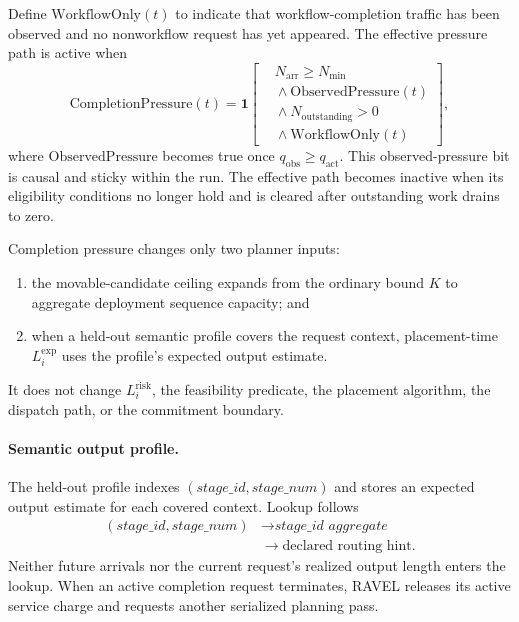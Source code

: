 \documentclass[letterpaper,twocolumn,10pt]{article}
\begin{document}
Define $\mathrm{WorkflowOnly}(t)$ to indicate that workflow-completion traffic
has been observed and no nonworkflow request has yet appeared.
The effective pressure path is active when
\begin{equation}
\mathrm{CompletionPressure}(t)
=
\mathbf{1}\!\left[
\begin{aligned}
    &N_{\mathrm{arr}} \ge N_{\min} \\
    &{}\land \mathrm{ObservedPressure}(t) \\
    &{}\land N_{\mathrm{outstanding}} > 0 \\
    &{}\land \mathrm{WorkflowOnly}(t)
\end{aligned}
\right],
\label{eq:appendix:completion-pressure}
\end{equation}
where $\mathrm{ObservedPressure}$ becomes true once
$q_{\mathrm{obs}}\ge q_{\mathrm{act}}$.
This observed-pressure bit is causal and sticky within the run.
The effective path becomes inactive when its eligibility conditions no longer
hold and is cleared after outstanding work drains to zero.

Completion pressure changes only two planner inputs:
\begin{enumerate}
    \item the movable-candidate ceiling expands from the ordinary bound $K$ to
          aggregate deployment sequence capacity; and
    \item when a held-out semantic profile covers the request context,
          placement-time $L_i^{\mathrm{exp}}$ uses the profile's expected
          output estimate.
\end{enumerate}
It does not change $L_i^{\mathrm{risk}}$, the feasibility predicate, the
placement algorithm, the dispatch path, or the commitment boundary.

\paragraph{Semantic output profile.}
The held-out profile indexes
$(\textit{stage\_id},\textit{stage\_num})$ and stores an expected output
estimate for each covered context.
Lookup follows
\begin{equation}
\begin{aligned}
(\textit{stage\_id},\textit{stage\_num})
   &\rightarrow
   \textit{stage\_id aggregate}\\
   &\rightarrow
   \text{declared routing hint}.
\end{aligned}
\label{eq:appendix:output-profile-fallback}
\end{equation}
Neither future arrivals nor the current request's realized output length
enters the lookup.
When an active completion request terminates, RAVEL releases its active
service charge and requests another serialized planning pass.
\end{document}
